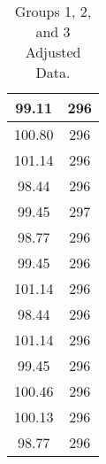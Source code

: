 \documentclass[conf]{new-aiaa}
\begin{document}
\begin{table}[ht]
\begin{minipage}{0.32\textwidth}
\begin{tabular}{||c c||}
            \hline
            99.11 & 296 \\
            \hline
            100.80 & 296 \\
            \hline
            101.14 & 296 \\
            \hline
            98.44 & 296 \\
            \hline
            99.45 & 297 \\
            \hline
            98.77 & 296 \\
            \hline
            99.45 & 296 \\
            \hline
            101.14 & 296 \\
            \hline
            98.44 & 296 \\
            \hline
            101.14 & 296 \\
            \hline
            99.45 & 296 \\
            \hline
            100.46 & 296 \\
            \hline
            100.13 & 296 \\
            \hline
            98.77 & 296 \\
            \hline
        \end{tabular}
    \end{minipage}
    \caption{Groups 1, 2, and 3 Adjusted Data.}
\end{table}
\end{document}
